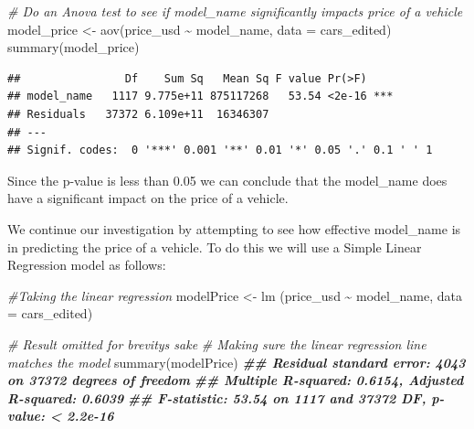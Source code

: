 \documentclass[
]{article}
\newenvironment{Shaded}{\begin{snugshade}}{\end{snugshade}}
\newcommand{\AttributeTok}[1]{\textcolor[rgb]{0.77,0.63,0.00}{#1}}
\newcommand{\CommentTok}[1]{\textcolor[rgb]{0.56,0.35,0.01}{\textit{#1}}}
\newcommand{\DocumentationTok}[1]{\textcolor[rgb]{0.56,0.35,0.01}{\textbf{\textit{#1}}}}
\newcommand{\FunctionTok}[1]{\textcolor[rgb]{0.00,0.00,0.00}{#1}}
\newcommand{\NormalTok}[1]{#1}
\newcommand{\OtherTok}[1]{\textcolor[rgb]{0.56,0.35,0.01}{#1}}
\newcommand{\SpecialCharTok}[1]{\textcolor[rgb]{0.00,0.00,0.00}{#1}}
\begin{document}
\begin{Shaded}
\begin{Highlighting}[]
\CommentTok{\# Do an Anova test to see if model\_name significantly impacts price of a vehicle}
\NormalTok{model\_price }\OtherTok{\textless{}{-}} \FunctionTok{aov}\NormalTok{(price\_usd }\SpecialCharTok{\textasciitilde{}}\NormalTok{ model\_name, }\AttributeTok{data =}\NormalTok{ cars\_edited)}
\FunctionTok{summary}\NormalTok{(model\_price)}
\end{Highlighting}
\end{Shaded}

\begin{verbatim}
##                Df    Sum Sq   Mean Sq F value Pr(>F)    
## model_name   1117 9.775e+11 875117268   53.54 <2e-16 ***
## Residuals   37372 6.109e+11  16346307                   
## ---
## Signif. codes:  0 '***' 0.001 '**' 0.01 '*' 0.05 '.' 0.1 ' ' 1
\end{verbatim}

Since the p-value is less than 0.05 we can conclude that the model\_name
does have a significant impact on the price of a vehicle.

We continue our investigation by attempting to see how effective
model\_name is in predicting the price of a vehicle. To do this we will
use a Simple Linear Regression model as follows:

\begin{Shaded}
\begin{Highlighting}[]
\CommentTok{\#Taking the linear regression}
\NormalTok{modelPrice }\OtherTok{\textless{}{-}} \FunctionTok{lm}\NormalTok{ (price\_usd }\SpecialCharTok{\textasciitilde{}}\NormalTok{ model\_name, }\AttributeTok{data =}\NormalTok{ cars\_edited)}
\end{Highlighting}
\end{Shaded}

\begin{Shaded}
\begin{Highlighting}[]
\CommentTok{\# Result omitted for brevity\textquotesingle{}s sake}
\CommentTok{\# Making sure the linear regression line matches the model}
\FunctionTok{summary}\NormalTok{(modelPrice)}
\DocumentationTok{\#\# Residual standard error: 4043 on 37372 degrees of freedom}
\DocumentationTok{\#\# Multiple R{-}squared:  0.6154, Adjusted R{-}squared:  0.6039 }
\DocumentationTok{\#\# F{-}statistic: 53.54 on 1117 and 37372 DF,  p{-}value: \textless{} 2.2e{-}16}
\end{Highlighting}
\end{Shaded}
\end{document}
